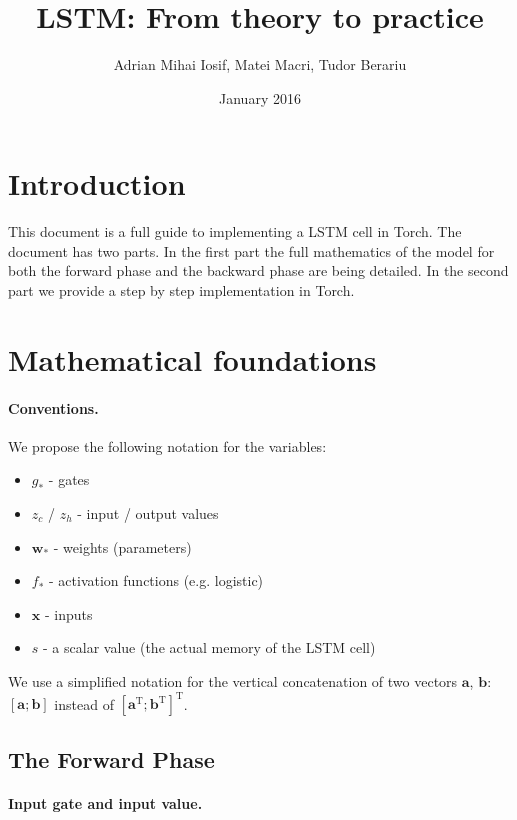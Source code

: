 \documentclass[11pt]{article}
\title{LSTM: From theory to practice}
\author{Adrian Mihai Iosif, Matei Macri, Tudor Berariu}
\date{January 2016}
\begin{document}
\maketitle

\section{Introduction}

This document is a full guide to implementing a LSTM cell in Torch. The document has two parts. In the first part the full mathematics of the model for both the forward phase and the backward phase are being detailed. In the second part we provide a step by step implementation in Torch.

\section{Mathematical foundations}

\paragraph{Conventions.} We propose the following notation for the variables:
\begin{itemize}
    \item $g_{*}$ - gates
    \item $z_{c}$ / $z_h$ - input / output values
    \item $\mathbf{w}_{*}$ - weights (parameters)
    \item $f_{*}$ - activation functions (e.g. logistic)
    \item $\mathbf{x}$ - inputs
    \item $s$ - a scalar value (the actual memory of the LSTM cell)
\end{itemize}

We use a simplified notation for the vertical concatenation of two vectors $\mathbf{a}$, $\mathbf{b}$: $\left[\mathbf{a}; \mathbf{b}\right]$ instead of $\left[ \mathbf{a}^{\text{T}} ; \mathbf{b}^{\text{T}} \right]^{\text{T}}$.

\begin{center}

\end{center}

\subsection{The Forward Phase}

\paragraph{Input gate and input value.}
\end{document}

